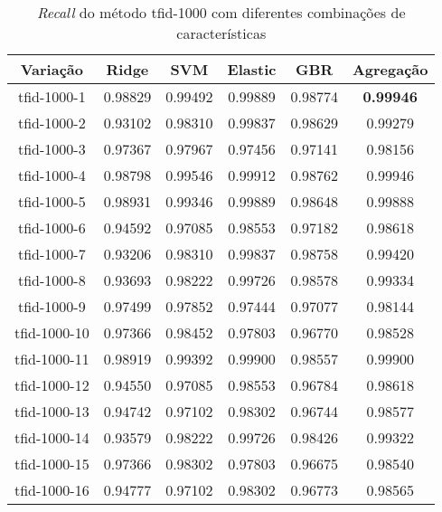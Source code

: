 \begin{table}[H]
\label{tab:recalltfid1000}
\centering
\begin{tabular}{|c| c c  c  c  c| }
\hline
Variação &  Ridge & SVM & Elastic & GBR & Agregação  \\ 
\hline
tfid-1000-1 & 0.98829 & 0.99492 & 0.99889 & 0.98774 & \textbf{0.99946} \\
\hline
tfid-1000-2 & 0.93102 & 0.98310 & 0.99837 & 0.98629 & 0.99279 \\
\hline
tfid-1000-3 & 0.97367 & 0.97967 & 0.97456 & 0.97141 & 0.98156 \\
\hline
tfid-1000-4 & 0.98798 & 0.99546 & 0.99912 & 0.98762 & 0.99946 \\
\hline
tfid-1000-5 & 0.98931 & 0.99346 & 0.99889 & 0.98648 & 0.99888 \\
\hline
tfid-1000-6 & 0.94592 & 0.97085 & 0.98553 & 0.97182 & 0.98618 \\
\hline
tfid-1000-7 & 0.93206 & 0.98310 & 0.99837 & 0.98758 & 0.99420 \\
\hline
tfid-1000-8 & 0.93693 & 0.98222 & 0.99726 & 0.98578 & 0.99334 \\
\hline
tfid-1000-9 & 0.97499 & 0.97852 & 0.97444 & 0.97077 & 0.98144 \\
\hline
tfid-1000-10 & 0.97366 & 0.98452 & 0.97803 & 0.96770 & 0.98528 \\
\hline
tfid-1000-11 & 0.98919 & 0.99392 & 0.99900 & 0.98557 & 0.99900 \\
\hline
tfid-1000-12 & 0.94550 & 0.97085 & 0.98553 & 0.96784 & 0.98618 \\
\hline
tfid-1000-13 & 0.94742 & 0.97102 & 0.98302 & 0.96744 & 0.98577 \\
\hline
tfid-1000-14 & 0.93579 & 0.98222 & 0.99726 & 0.98426 & 0.99322 \\
\hline
tfid-1000-15 & 0.97366 & 0.98302 & 0.97803 & 0.96675 & 0.98540 \\
\hline
tfid-1000-16 & 0.94777 & 0.97102 & 0.98302 & 0.96773 & 0.98565 \\
\hline
\end{tabular}
\caption{\textit{Recall} do método tfid-1000 com diferentes combinações de características}
\end{table}

